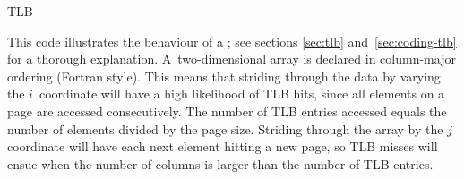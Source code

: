 
 {TLB}
\label{sec:tlb-code}

This code illustrates the behaviour of a ; see sections
\ref{sec:tlb} and~\ref{sec:coding-tlb} for a thorough
explanation. A~two-dimensional array is declared in column-major
ordering (Fortran style). This means that striding through the data by
varying the $i$~coordinate will have a high likelihood of TLB hits,
since all elements on a page are accessed consecutively. The number of
TLB entries accessed equals the number of elements divided by the page
size. Striding through the array by the $j$ coordinate will have each
next element hitting a new page, so TLB misses will ensue when the
number of columns is larger than the number of TLB entries.



